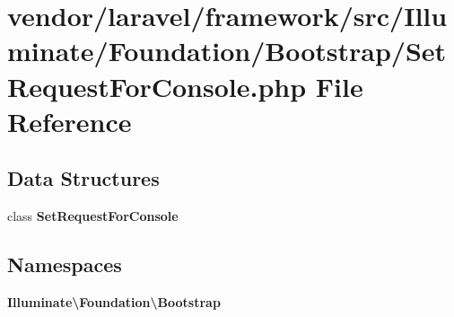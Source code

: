 \section{vendor/laravel/framework/src/\+Illuminate/\+Foundation/\+Bootstrap/\+Set\+Request\+For\+Console.php File Reference}
\label{_set_request_for_console_8php}
\subsection*{Data Structures}
\begin{DoxyCompactItemize}
\item 
class {\bf Set\+Request\+For\+Console}
\end{DoxyCompactItemize}
\subsection*{Namespaces}
\begin{DoxyCompactItemize}
\item 
 {\bf Illuminate\textbackslash{}\+Foundation\textbackslash{}\+Bootstrap}
\end{DoxyCompactItemize}
